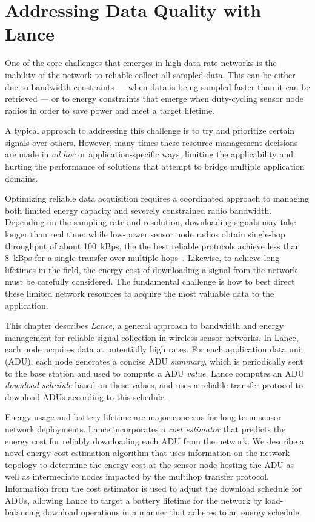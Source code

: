 \chapter{Addressing Data Quality with Lance}
\label{chapter-lance}

One of the core challenges that emerges in high data-rate networks is the
inability of the network to reliable collect all sampled data. This can be
either due to bandwidth constraints --- when data is being sampled faster
than it can be retrieved --- or to energy constraints that emerge when
duty-cycling sensor node radios in order to save power and meet a target
lifetime.

A typical approach to addressing this challenge is to try and prioritize
certain signals over others. However, many times these resource-management
decisions are made in \textit{ad hoc} or application-specific ways, limiting
the applicability and hurting the performance of solutions that attempt to
bridge multiple application domains.

Optimizing reliable data acquisition requires a coordinated approach to
managing both limited energy capacity and severely constrained radio
bandwidth. Depending on the sampling rate and resolution, downloading signals
may take longer than real time: while low-power sensor node radios obtain
single-hop throughput of about 100~kBps, the the best reliable protocols
achieve less than 8~kBps for a single transfer over multiple
hops~\cite{flush-sensys07}. Likewise, to achieve long lifetimes in the field,
the energy cost of downloading a signal from the network must be carefully
considered. The fundamental challenge is how to best direct these limited
network resources to acquire the most valuable data to the application.

This chapter describes \textit{Lance}, a general approach to bandwidth and
energy management for reliable signal collection in wireless sensor networks.
In Lance, each node acquires data at potentially high rates. For each
application data unit (ADU), each node generates a concise ADU
\textit{summary}, which is periodically sent to the base station and used to
compute a ADU \textit{value}. Lance computes an ADU \textit{download
schedule} based on these values, and uses a reliable transfer protocol to
download ADUs according to this schedule.

Energy usage and battery lifetime are major concerns for long-term sensor
network deployments. Lance incorporates a \textit{cost estimator} that
predicts the energy cost for reliably downloading each ADU from the network.
We describe a novel energy cost estimation algorithm that uses information on
the network topology to determine the energy cost at the sensor node hosting
the ADU as well as intermediate nodes impacted by the multihop transfer
protocol. Information from the cost estimator is used to adjust the download
schedule for ADUs, allowing Lance to target a battery lifetime for the
network by load-balancing download operations in a manner that adheres to an
energy schedule.

